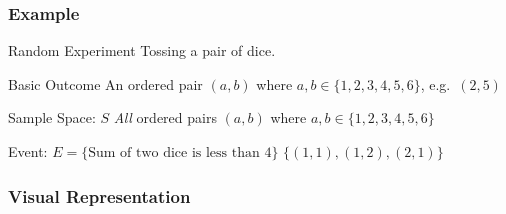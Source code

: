 \documentclass[handout]{beamer}
\begin{document}
\begin{frame}
\frametitle{Example}
\begin{block}{Random Experiment}
Tossing a pair of dice.
\end{block}
\begin{block}{Basic Outcome}
An ordered pair $(a, b)$ where $a,b \in \{1, 2, 3, 4, 5, 6\}$, e.g.\ $(2,5)$
\end{block}
\begin{block}{Sample Space: $S$}
\emph{All} ordered pairs $(a, b)$ where $a,b \in \{1, 2, 3, 4, 5, 6\}$
\end{block}

\begin{block}{Event: $E = \{\mbox{Sum of two dice is less than 4}\}$}
$\{(1,1), (1,2), (2,1)\}$
\end{block}

\end{frame}
\begin{frame}
\frametitle{Visual Representation}
\begin{figure}
\centering
{}
\end{figure}
\end{frame}
\end{document}
